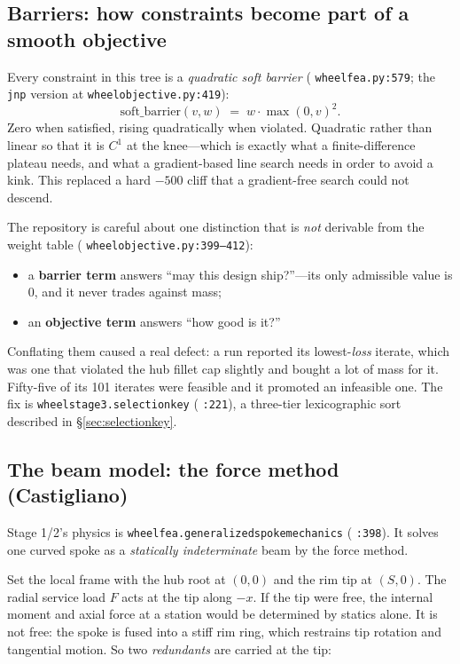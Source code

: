 \documentclass[11pt,a4paper]{article}
\DeclareRobustCommand{\code}[1]{%
  \texttt{\small\def\_{\textunderscore\discretionary{}{}{}}#1}}
\newcommand{\at}[2]{\code{#1:#2}}
\begin{document}
\subsection{Barriers: how constraints become part of a smooth objective}
\label{sec:barriers}

Every constraint in this tree is a \emph{quadratic soft barrier}
(\at{wheel\_fea.py}{579}; the \code{jnp} version at \at{wheel\_objective.py}{419}):
%
\begin{equation}
  \mathrm{soft\_barrier}(v, w) \;=\; w \cdot \max(0, v)^2 .
  \label{eq:softbarrier}
\end{equation}
%
Zero when satisfied, rising quadratically when violated. Quadratic rather than linear
so that it is $C^1$ at the knee---which is exactly what a finite-difference plateau
needs, and what a gradient-based line search needs in order to avoid a kink. This
replaced a hard $-500$ cliff that a gradient-free search could not descend.

The repository is careful about one distinction that is \emph{not} derivable from the
weight table (\at{wheel\_objective.py}{399--412}):

\begin{itemize}
\item a \textbf{barrier term} answers ``may this design ship?''---its only admissible
  value is 0, and it never trades against mass;
\item an \textbf{objective term} answers ``how good is it?''
\end{itemize}

Conflating them caused a real defect: a run reported its lowest-\emph{loss} iterate,
which was one that violated the hub fillet cap slightly and bought a lot of mass for
it. Fifty-five of its 101 iterates were feasible and it promoted an infeasible one. The
fix is \code{wheel\_stage3.selection\_key} (\code{:221}), a three-tier lexicographic
sort described in \S\ref{sec:selectionkey}.

\subsection{The beam model: the force method (Castigliano)}
\label{sec:castigliano}

Stage 1/2's physics is \code{wheel\_fea.generalized\_spoke\_mechanics} (\code{:398}).
It solves one curved spoke as a \emph{statically indeterminate} beam by the force
method.

Set the local frame with the hub root at $(0,0)$ and the rim tip at $(S,0)$. The radial
service load $F$ acts at the tip along $-x$. If the tip were free, the internal moment
and axial force at a station would be determined by statics alone. It is not free: the
spoke is fused into a stiff rim ring, which restrains tip rotation and tangential
motion. So two \emph{redundants} are carried at the tip:
\end{document}
